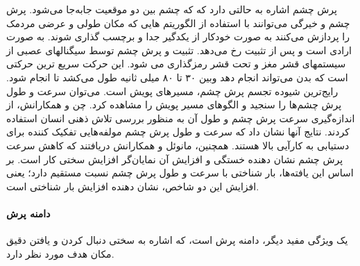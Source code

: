 پرش چشم
اشاره به حالتی دارد که که چشم بین دو موقعیت جابه‌جا می‌شود.
پرش چشم و خیرگی می‌توانند با استفاده از الگوریتم هایی که مکان طولی و عرضی مردمک را پردازش می‌کنند به صورت خودکار از یکدگیر جدا و برچسب گذاری‌ شوند.
به صورت ارادی است و پس از تثبیت رخ می‌دهد.
تثبیت و پرش چشم توسط سیگنالهای عصبی از سیستمهای قشر مغز و تحت قشر رمزگذاری می شود. این حرکت سریع ترین حرکتی است که بدن می‌تواند انجام دهد وبین ۳۰ تا ۸۰ میلی ثانیه طول می‌کشد تا انجام شود. رایج‌ترین شیوده تجسم پرش چشم، مسیرهای پویش
است. 
 می‌توان سرعت و طول پرش چشم‌ها را 
سنجيد و الگوهای مسير پویش را مشاهده كرد.
\cite{zagermann2016measuring}
چن و همکارانش، از اندازه‌گيری سرعت پرش چشم و 
طول آن به منظور بررسی تلاش ذهنی انسان استفاده كردند. نتایج آنها نشان داد كه سرعت و طول پرش 
چشم مولفه‌هایی  تفکيک  كننده  برای  دستیابی  به  كارآیی بالا  هستند.
\cite{chen2011eye}
همچنين،  مانوئل  و 
همکارانش دریافتند كه كاهش سرعت پرش چشم نشان دهنده خستگی و افزایش آن نمایان‌گر افزایش 
سختی كار است.
\cite{barrios2004adele}
بر اساس این یافته‌ها، بار شناختی با سرعت و طول پرش چشم نسبت مستقيم 
دارد؛ یعنی افزایش این دو شاخص، نشان دهنده افزایش بار شناختی است.
\paragraph{دامنه پرش}
یک ویژگی مفید دیگر، دامنه پرش
است، که اشاره به سختی دنبال کردن و یافتن دقیق مکان هدف مورد نظر دارد.
\cite{Hyona2003}
